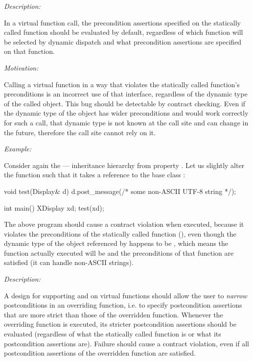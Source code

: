 
\emph{Description:}

In a virtual function call, the precondition assertions specified on the statically called function should be evaluated by default, regardless of which function will be selected by dynamic dispatch and what  precondition assertions are specified on that function.

\emph{Motivation:}

Calling a virtual function in a way that violates the statically called function's preconditions is an incorrect use of that interface, regardless of the dynamic type of the called object. This bug should be detectable by contract checking. Even if the dynamic type of the object has wider preconditions and would work correctly for such a call, that dynamic type is not known at the call site and can change in the future, therefore the call site cannot rely on it.

\emph{Example:}

Consider again the  ---  inheritance hierarchy from property . Let us slightly alter the  function such that it takes a reference to the base class :
\begin{codeblock}
void test(Display& d) {
  d.post_message(/* some non-ASCII UTF-8 string */);
}

int main() {
  XDisplay xd;
  test(xd);
}
\end{codeblock}
The above program should cause a contract violation when executed, because it violates the preconditions of the statically called function (), even though  the dynamic type of the object referenced by  happens to be , which means the function actually executed will be  and the preconditions of that function are satisfied (it can handle non-ASCII strings).


\emph{Description:}

A design for supporting  and  on virtual functions should allow the user to \emph{narrow} postconditions in an overriding function, i.e. to specify postcondition assertions that are more strict than those of the overridden function. Whenever the overriding function is executed, its stricter postcondition assertions should be evaluated (regardless of what the statically called function is or what its postcondition assertions are). Failure should cause a contract violation, even if all postcondition assertions of the overridden function are satisfied.

